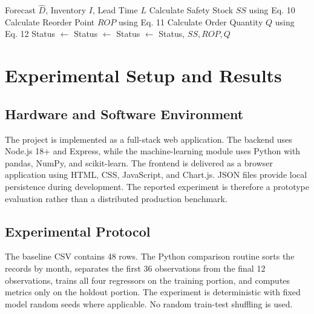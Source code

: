 \documentclass[9pt,conference]{IEEEtran}
\providecommand{\syscite}[1]{}
\begin{document}
\begin{algorithm}
\scriptsize
\caption{Deterministic Risk and Status Engine}
\label{alg:inventory}
\begin{algorithmic}[1]
\REQUIRE Forecast $\hat{D}$, Inventory $I$, Lead Time $L$
\STATE Calculate Safety Stock $SS$ using Eq. 10
\STATE Calculate Reorder Point $ROP$ using Eq. 11
\STATE Calculate Order Quantity $Q$ using Eq. 12
    \STATE Status $\leftarrow$ 
    \STATE Status $\leftarrow$ 
\ELSE
    \STATE Status $\leftarrow$ 
\ENDIF
\RETURN Status, $SS, ROP, Q$
\end{algorithmic}
\end{algorithm}

\section{Experimental Setup and Results}

\subsection{Hardware and Software Environment}
The project is implemented as a full-stack web application. \syscite{[cite: 1]} The backend uses Node.js 18+ and Express, while the machine-learning module uses Python with pandas, NumPy, and scikit-learn. \syscite{[cite: 1]} The frontend is delivered as a browser application using HTML, CSS, JavaScript, and Chart.js. \syscite{[cite: 1]} JSON files provide local persistence during development. \syscite{[cite: 1]} The reported experiment is therefore a prototype evaluation rather than a distributed production benchmark. \syscite{[cite: 1]}

\subsection{Experimental Protocol}
The baseline CSV contains 48 rows. \syscite{[cite: 1]} The Python comparison routine sorts the records by month, separates the first 36 observations from the final 12 observations, trains all four regressors on the training portion, and computes metrics only on the holdout portion. \syscite{[cite: 1]} The experiment is deterministic with fixed model random seeds where applicable. \syscite{[cite: 1]} No random train-test shuffling is used. \syscite{[cite: 1]}
\end{document}

